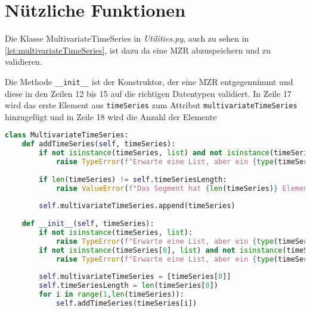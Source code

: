 \section{Nützliche Funktionen}
Die Klasse MultivariateTimeSeries in \textit{Utilities.py}, auch zu sehen in \autoref{lst:multivariateTimeSeries}, ist dazu da eine \ac{MZR} abzuspeichern und zu validieren.

Die Methode \lstinline{__init__} ist der Konstruktor, der eine \ac{MZR} entgegennimmt und diese in den Zeilen 12 bis 15 auf die richtigen Datentypen validiert. In Zeile 17 wird das erste Element aus \lstinline|timeSeries| zum Attribut \lstinline|multivariateTimeSeries| hinzugefügt und in Zeile 18 wird die Anzahl der Elemente 

\begin{lstlisting}[caption=Klasse für \ac{MZR}, language=Python, label=lst:multivariateTimeSeries, style=Python]
class MultivariateTimeSeries:
    def addTimeSeries(self, timeSeries):
        if not isinstance(timeSeries, list) and not isinstance(timeSeries, np.ndarray):
            raise TypeError(f"Erwarte eine List, aber ein {type(timeSeries)} erhalten.")
        
        if len(timeSeries) != self.timeSeriesLength:
            raise ValueError(f"Das Segment hat {len(timeSeries)} Element(e), muss aber {self.timeSeriesLength} haben.")
        
        self.multivariateTimeSeries.append(timeSeries)
    
    def __init__(self, timeSeries):
        if not isinstance(timeSeries, list):
            raise TypeError(f"Erwarte eine List, aber ein {type(timeSeries)} erhalten.")
        if not isinstance(timeSeries[0], list) and not isinstance(timeSeries[0], np.ndarray):
            raise TypeError(f"Erwarte eine List, aber ein {type(timeSeries[0])} erhalten.")
        
        self.multivariateTimeSeries = [timeSeries[0]]
        self.timeSeriesLength = len(timeSeries[0])
        for i in range(1,len(timeSeries)):
            self.addTimeSeries(timeSeries[i])
\end{lstlisting}